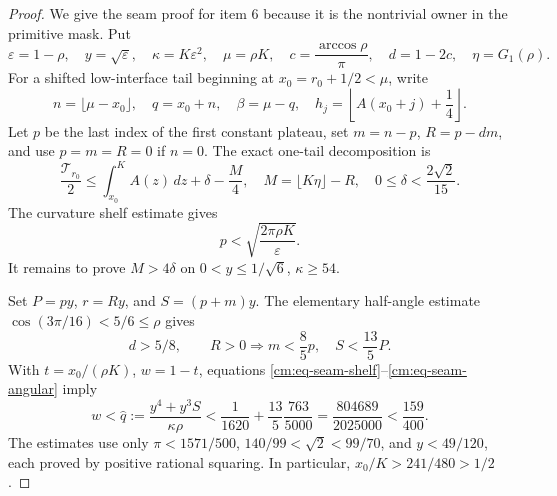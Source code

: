 \documentclass[11pt]{article}
\numberwithin{equation}{section}
\theoremstyle{definition}
\theoremstyle{remark}
\begin{document}
\begin{proof}
We give the seam proof for item 6 because it is the nontrivial owner in the
primitive mask.  Put
\[
 \varepsilon=1-\rho,\quad y=\sqrt\varepsilon,\quad
 \kappa=K\varepsilon^2,\quad \mu=\rho K,\quad
 c=\frac{\arccos\rho}{\pi},\quad d=1-2c,\quad
 \eta=G_1(\rho).
\]
For a shifted low-interface tail beginning at
\(x_0=r_0+1/2<\mu\), write
\[
 n=\lfloor\mu-x_0\rfloor,\quad q=x_0+n,\quad
 \beta=\mu-q,\quad
 h_j=\left\lfloor A(x_0+j)+\frac14\right\rfloor.
\]
Let \(p\) be the last index of the first constant plateau, set
\(m=n-p\), \(R=p-dm\), and use \(p=m=R=0\) if \(n=0\).  The exact
one-tail decomposition is
\begin{equation}
 \frac{\mathcal T_{r_0}}2
 \leq\int_{x_0}^K A(z)\,dz+\delta-\frac M4,
 \quad M=\lfloor K\eta\rfloor-R,
 \quad 0\leq\delta<\frac{2\sqrt2}{15}.
 \label{cm:eq-seam-tail}
\end{equation}
The curvature shelf estimate gives
\begin{equation}
 p<\sqrt{\frac{2\pi\rho K}{\varepsilon}}.
 \label{cm:eq-seam-shelf}
\end{equation}
It remains to prove \(M>4\delta\) on
\(0<y\leq1/\sqrt6\), \(\kappa\geq54\).

Set \(P=py\), \(r=Ry\), and \(S=(p+m)y\).  The elementary half-angle
estimate \(\cos(3\pi/16)<5/6\leq\rho\) gives
\begin{equation}
 d>5/8,\qquad R>0\Longrightarrow
 m<\frac85p,\quad S<\frac{13}{5}P.
 \label{cm:eq-seam-angular}
\end{equation}
With \(t=x_0/(\rho K)\), \(w=1-t\), equations
\eqref{cm:eq-seam-shelf}--\eqref{cm:eq-seam-angular} imply
\[
 w<\widehat q
 :=\frac{y^4+y^3S}{\kappa\rho}
 <\frac1{1620}+\frac{13}{5}\frac{763}{5000}
 =\frac{804689}{2025000}<\frac{159}{400}.
\]
The estimates use only
\(\pi<1571/500\),
\(140/99<\sqrt2<99/70\), and
\(y<49/120\), each proved by positive rational squaring.  In particular,
\(x_0/K>241/480>1/2\).


\end{proof}
\end{document}
